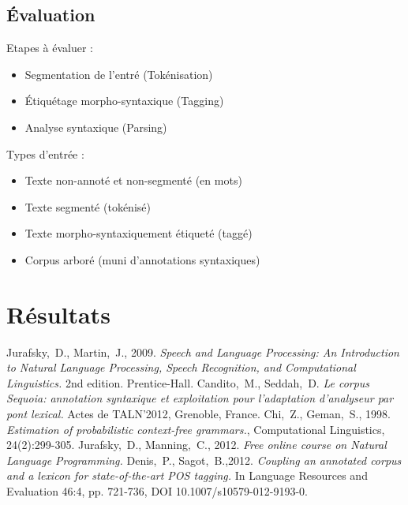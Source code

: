 \documentclass[12pt]{article}
\begin{document}
\subsection{\'Evaluation}

Etapes \`a \'evaluer :
\begin{itemize}
\item Segmentation de l'entr\'e (Tok\'enisation)
\item \'Etiqu\'etage morpho-syntaxique (Tagging)
\item Analyse syntaxique (Parsing)
\end{itemize}

Types d'entr\'ee :
\begin{itemize}
\item Texte non-annot\'e et non-segment\'e (en mots)
\item Texte segment\'e (tok\'enis\'e)
\item Texte morpho-syntaxiquement \'etiquet\'e (tagg\'e)
\item Corpus arbor\'e (muni d'annotations syntaxiques)
\end{itemize}


\section{R\'esultats}




\begin{thebibliography}{9}
    Jurafsky,~D., Martin,~J., 2009. \emph{Speech and Language Processing: An Introduction to Natural Language Processing, Speech Recognition, and Computational Linguistics.} 2nd edition. Prentice-Hall.
    Candito,~M., Seddah,~D.
    \emph{Le corpus Sequoia: annotation syntaxique et exploitation pour
    l'adaptation d'analyseur par pont lexical.} Actes de TALN'2012, Grenoble,
    France.
    Chi,~Z., Geman,~S., 1998.
    \emph{Estimation of probabilistic context-free grammars.}, Computational Linguistics, 24(2):299-305.
    Jurafsky,~D., Manning,~C., 2012. \emph{Free online course on Natural
    Language Programming.}
    Denis,~P., Sagot,~B.,2012.
    \emph{Coupling an annotated corpus and a lexicon for state-of-the-art POS
    tagging.} In Language Resources and Evaluation 46:4, pp. 721-736,
    DOI 10.1007/s10579-012-9193-0.
    
\end{thebibliography}
\end{document}
